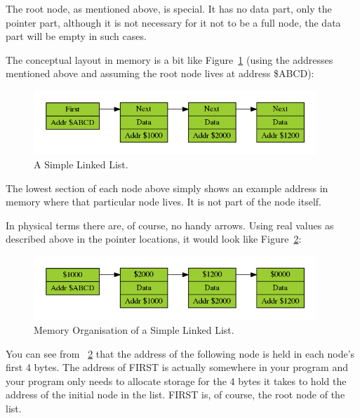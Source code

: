 The root node, as mentioned above, is special. It has no data part,
    only the pointer part, although it is not necessary for it not to be a full node, the data part will be empty in such cases.

The conceptual layout in memory is a bit like Figure~\ref{fig:ASimpleLinkedList} (using the
    addresses mentioned above and assuming the root node lives at address \$ABCD):

\begin{figure}[h]
\center
\includegraphics[width=0.95\textwidth]{Content/images/LL_Single_list.png}
\caption{A Simple Linked List.}
\label{fig:ASimpleLinkedList}
\end{figure}

The lowest section of each node above simply shows an example address in memory where that particular node lives. It is not part of the node itself.

In physical terms there are, of course, no handy arrows. Using real values as
    described above in the pointer locations, it would look like Figure~\ref{fig:MemoryOrganisationOfASimpleLinkedList}:

\begin{figure}[h]
\center
\includegraphics[width=0.95\textwidth]{Content/images/LL_Single_Memory.png}
\caption{Memory Organisation of a Simple Linked List.}
\label{fig:MemoryOrganisationOfASimpleLinkedList}
\end{figure}

You can see from \figurename~\ref{fig:MemoryOrganisationOfASimpleLinkedList} that the address of the following node is held in each node's first 4
    bytes. The address of FIRST is actually somewhere in your program
    and your program only needs to allocate storage for the 4 bytes it takes
    to hold the address of the initial node in the list. FIRST is, of course,
    the root node of the list.

